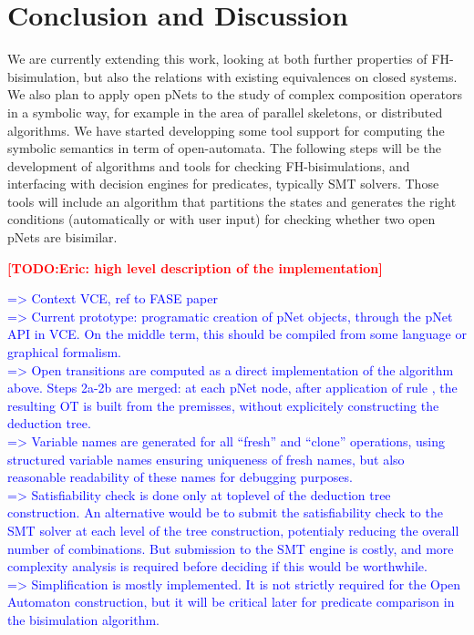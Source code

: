 \documentclass{lncs/llncs}
\newcommand{\TODO}[1]{\textcolor{red}{\textbf{[TODO:#1]}}}
\newcommand{\ERIC}[1]{\textcolor{blue}{#1}}
\begin{document}



\section{Conclusion and Discussion}
\label{section:conclusion}


We are currently extending this work,  looking at  both further properties of 
FH-bisimulation, but also
the relations with existing equivalences on closed systems.
We also plan to apply open pNets to the study of complex composition
operators in a symbolic way, for example in the area of parallel
skeletons, or distributed algorithms.
We have started developping some tool support for computing the
symbolic semantics in term of open-automata. The following steps will
be the development of algorithms and tools for checking 
FH-bisimulations, and interfacing with decision engines for
predicates, typically SMT solvers. Those tools will include
an algorithm that partitions the states and generates the right
conditions (automatically or with user input) for checking
whether two open pNets are bisimilar.

\TODO{Eric: high level description of the implementation}

\ERIC{
=> Context VCE, ref to FASE paper\\
=> Current prototype: programatic creation of pNet objects, through the pNet API in VCE. On the middle term, this should be compiled from some language or graphical formalism.\\
=> Open transitions are computed as a direct implementation of the algorithm above. Steps 2a-2b are merged: at each pNet node, after application of rule \TrDeux, the resulting OT is built from the premisses, without explicitely constructing the deduction tree. \\
=> Variable names are generated for all ``fresh'' and ``clone'' operations, using structured variable names ensuring uniqueness of fresh names, but also reasonable readability of these names for debugging purposes.\\
=> Satisfiability check is done only at toplevel of the deduction tree construction. An alternative would be to submit the satisfiability check to the SMT solver at each level of the tree construction, potentialy reducing the overall number of combinations. But submission to the SMT engine is costly, and more complexity analysis is required before deciding if this would be worthwhile.\\
=> Simplification is mostly implemented. It is not strictly required for the Open Automaton construction, but it will be critical later for predicate comparison in the bisimulation algorithm.}
\end{document}
